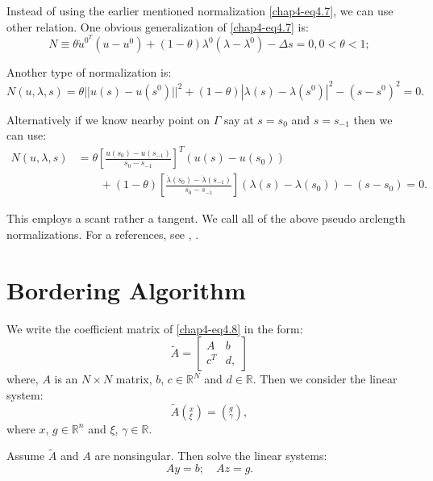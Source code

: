 \begin{note*}
Instead of using the earlier mentioned normalization
\eqref{chap4-eq4.7}, we can  use other relation. One obvious
generalization of \eqref{chap4-eq4.7} is:  
$$
N \equiv \theta \dot{u}^{0^T}(u - u^0) + (1- \theta ) \lambda^0 (\lambda -
\lambda^0 ) - \Delta s = 0, 0 < \theta < 1; 
$$\pageoriginale

Another type of normalization is:
$$
N(u, \lambda, s) = \theta || u(s) - u(s^0) ||^2 + (1- \theta) |
\lambda (s) - \lambda (s^0) |^2 - (s - s^0)^2 = 0. 
$$

Alternatively if we know nearby point on $\Gamma$ say at $s = s_0$ and
$s = s_{-1}$ then we can use: 
\begin{align*}
N(u,\lambda, s) & = \theta \left[\frac{u(s_0) - u(s_{-1})}{s_0-s_{-1}}
  \right]^T
(u(s) - u(s_0))\\
& \qquad  + (1- \theta) \left[\frac{ \dot{\lambda} (s_0) - \dot{\lambda}
    (s_{-1})}{s_0 - s_{-1}} \right](\lambda (s) - \lambda (s_0)) - (s - s_0)
= 0. 
\end{align*}

This employs a scant rather a tangent. We call all of the above pseudo
arclength normalizations. For a references, see \cite{key18},
\cite{key19}.    
\end{note*}

\setcounter{section}{10}
\section{Bordering Algorithm}\label{chap4-sec4.11}%

We write the coefficient matrix of \eqref{chap4-eq4.8} in the form:
\begin{equation*}
\tilde{A} = 
\begin{bmatrix}
A & b \\ c^T &  d ,
\end{bmatrix}\tag{4.12}\label{chap4-eq4.12}
\end{equation*}
where, $A$ is an $N \times N$ matrix, $b$, $c \in \mathbb{R}^N$
and $d \in \mathbb{R}$. Then we consider the linear system: 
\begin{equation*}
\tilde{A} \left(^{x}_\xi \right) = \left(^{g}_\gamma \right),
\tag{4.13}\label{chap4-eq4.13} 
\end{equation*} 
where $x$, $g \in \mathbb{R}^n$ and $\xi$, $\gamma \in
\mathbb{R}$. 

Assume $\tilde{A}$ and $A$ are nonsingular. Then solve the linear systems:
\begin{equation*}
Ay = b;\quad Az = g. \tag{4.14a}\label{chap4-eq4.14a}
\end{equation*} 

